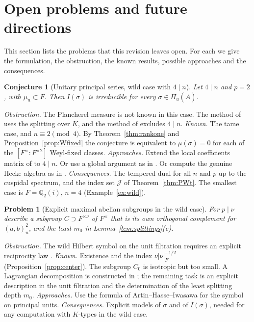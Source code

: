 \documentclass[12pt,letterpaper]{article}
\numberwithin{equation}{section}
\newtheorem{conjecture}[theorem]{Conjecture}
\newtheorem{problem}[theorem]{Problem}
\theoremstyle{definition}
\newcommand{\Q}{\mathbb Q}
\newcommand{\bA}{\overline{A}}
\begin{document}
\section{Open problems and future directions}\label{sec:open}

This section lists the problems that this revision leaves open.  For each we give the
formulation, the obstruction, the known results, possible approaches and the consequences.

\begin{conjecture}[Unitary principal series, wild case with $4\mid n$]\label{conj:wild4}
Let $4\mid n$ and $p=2$, with $\mu_n\subset F$.  Then $I(\sigma)$ is irreducible for every
$\sigma\in\Pi_u(\bA)$.
\end{conjecture}
\emph{Obstruction.}  The Plancherel measure is not known in this case.  The method of
\cite{GS16} uses the splitting over $K$, and the method of \cite{Sz19} excludes $4\mid n$.
\emph{Known.}  The tame case, and $n\equiv2\pmod4$.  By Theorem~\ref{thm:rankone} and
Proposition~\ref{prop:Wfixed} the conjecture is equivalent to $\mu(\sigma)=0$ for each of
the $[F^\times:F^{\times2}]$ Weyl-fixed classes.  \emph{Approaches.}  Extend the local
coefficients matrix of \cite{Sz19} to $4\mid n$.  Or use a global argument as in
\cite[Theorem~5.7]{Sz19}.  Or compute the genuine Hecke algebra as in \cite{Ka21}.
\emph{Consequences.}  The tempered dual for all $n$ and $p$ up to the cuspidal spectrum,
and the index set $\mathcal J$ of Theorem~\ref{thm:PWt}.  The smallest case is $F=\Q_2(i)$,
$n=4$ (Example~\ref{ex:wild}).

\begin{problem}[Explicit maximal abelian subgroups in the wild case]\label{prob:lagrangian}
For $p\mid\nu$ describe a subgroup $C\supset F^{\times\nu}$ of $F^\times$ that is its own
orthogonal complement for $(a,b)_n^2$, and the least $m_0$ in
Lemma~\ref{lem:splittings}(c).
\end{problem}
\emph{Obstruction.}  The wild Hilbert symbol on the unit filtration requires an explicit
reciprocity law \cite{Se81}.  \emph{Known.}  Existence and the index
$\nu|\nu|_F^{-1/2}$ (Proposition~\ref{prop:center}).  The subgroup $C_0$ is isotropic but
too small. A Lagrangian decomposition is constructed in \cite[Lemma~2.3]{Sz19};
the remaining task is an explicit description in the unit filtration and the
determination of the least splitting depth $m_0$.
\emph{Approaches.}  Use the formula of Artin--Hasse--Iwasawa for the symbol on principal
units.  \emph{Consequences.}  Explicit models of $\sigma$ and of $I(\sigma)$, needed for any
computation with $K$-types in the wild case.
\end{document}
